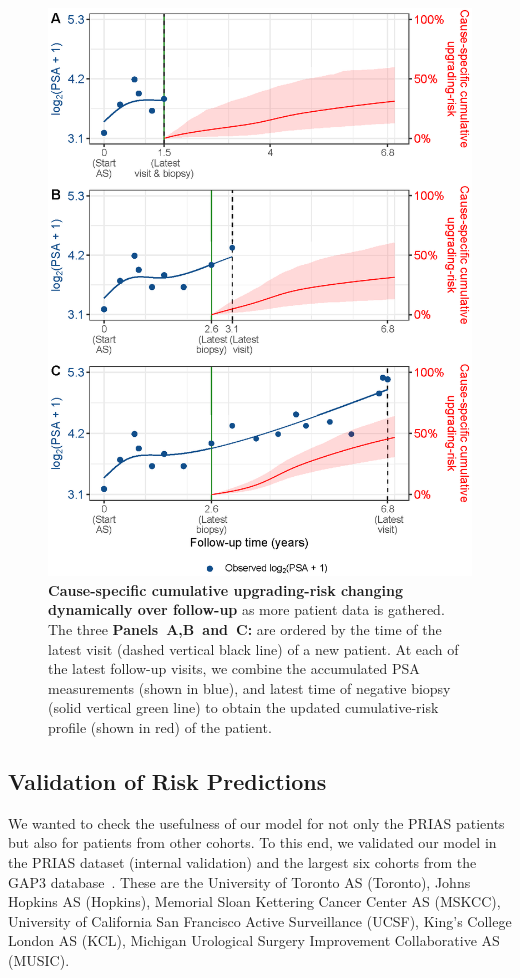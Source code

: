 \begin{figure}
\centerline{\includegraphics[width=\columnwidth]{images/dynrisk_plot_102.eps}}
\caption{\textbf{Cause-specific cumulative upgrading-risk changing dynamically over follow-up} as more patient data is gathered. The three \textbf{Panels~A,B~and~C:} are ordered by the time of the latest visit (dashed vertical black line) of a new patient. At each of the latest follow-up visits, we combine the accumulated PSA measurements (shown in blue), and latest time of negative biopsy (solid vertical green line) to obtain the updated cumulative-risk profile (shown in red) of the patient.}
\label{fig:dynrisk_plot_102}
\end{figure}

\clearpage
\subsection{Validation of Risk Predictions}
We wanted to check the usefulness of our model for not only the PRIAS patients but also for patients from other cohorts. To this end, we validated our model in the PRIAS dataset (internal validation) and the largest six cohorts from the GAP3 database~\citep{gap3_2018}. These are the University of Toronto AS (Toronto), Johns Hopkins AS (Hopkins), Memorial Sloan Kettering Cancer Center AS (MSKCC), University of California San Francisco Active Surveillance (UCSF), King's College London AS (KCL), Michigan Urological Surgery Improvement Collaborative AS (MUSIC).

